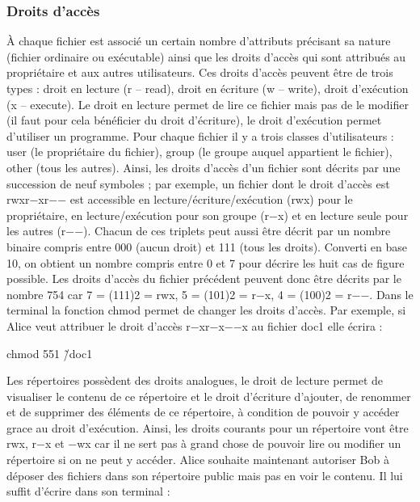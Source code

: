 \subsubsection{Droits d'accès}
À chaque fichier est associé un certain nombre d’attributs précisant sa nature (fichier ordinaire ou exécutable)
ainsi que les droits d’accès qui sont attribués au propriétaire et aux autres utilisateurs. Ces droits d’accès peuvent
être de trois types : droit en lecture (r – read), droit en écriture (w – write), droit d’exécution (x – execute). Le
droit en lecture permet de lire ce fichier mais pas de le modifier (il faut pour cela bénéficier du droit d’écriture),
le droit d’exécution permet d’utiliser un programme.
Pour chaque fichier il y a trois classes d’utilisateurs : user (le propriétaire du fichier), group (le groupe
auquel appartient le fichier), other (tous les autres). Ainsi, les droits d’accès d’un fichier sont décrits par une
succession de neuf symboles ; par exemple, un fichier dont le droit d’accès est rwxr−xr−− est accessible en
lecture/écriture/exécution (rwx) pour le propriétaire, en lecture/exécution pour son groupe (r−x) et en lecture
seule pour les autres (r−−).
Chacun de ces triplets peut aussi être décrit par un nombre binaire compris entre 000 (aucun droit) et 111
(tous les droits). Converti en base 10, on obtient un nombre compris entre 0 et 7 pour décrire les huit cas
de figure possible. Les droits d’accès du fichier précédent peuvent donc être décrits par le nombre 754 car
7 = (111)2 = rwx, 5 = (101)2 = r−x, 4 = (100)2 = r−−.
Dans le terminal la fonction chmod permet de changer les droits d’accès. Par exemple, si Alice veut attribuer le
droit d’accès r−xr−x−−x au fichier doc1 elle écrira :



\begin{tcolorbox}[lefttitle=2cm, colframe=gray!75!black, title=Terminal de commandes]
chmod 551 \~\slash doc1
\end{tcolorbox}

Les répertoires possèdent des droits analogues, le droit de lecture permet de visualiser le contenu de ce
répertoire et le droit d’écriture d’ajouter, de renommer et de supprimer des éléments de ce répertoire, à
condition de pouvoir y accéder grace au droit d’exécution. Ainsi, les droits courants pour un répertoire vont être
rwx, r−x et −wx car il ne sert pas à grand chose de pouvoir lire ou modifier un répertoire si on ne peut y accéder.
Alice souhaite maintenant autoriser Bob à déposer des fichiers dans son répertoire public mais pas en voir le
contenu. Il lui suffit d’écrire dans son terminal :

